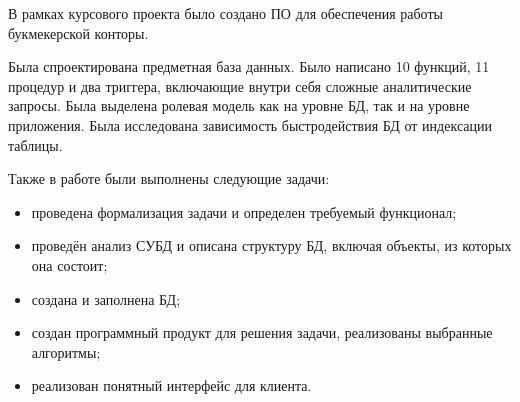В рамках курсового проекта было создано ПО для обеспечения работы букмекерской конторы.

Была спроектирована предметная база данных.
Было написано 10 функций, 11 процедур и два триггера, включающие внутри себя сложные аналитические запросы. 
Была выделена ролевая модель как на уровне БД, так и на уровне приложения. 
Была исследована зависимость быстродействия БД от индексации таблицы.

Также в работе были выполнены следующие задачи:
\begin{itemize}
	\item проведена формализация задачи и определен требуемый функционал;
	\item проведён анализ СУБД и описана структуру БД, включая объекты, из которых она состоит;
	\item создана и заполнена БД;
	\item создан программный продукт для решения задачи, реализованы выбранные алгоритмы;
	\item реализован понятный интерфейс для клиента.
\end{itemize}